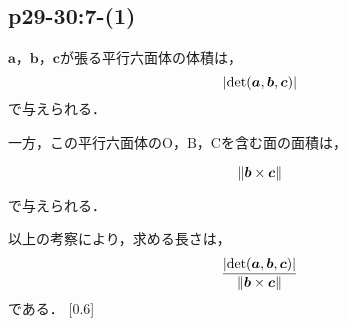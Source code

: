\documentclass[uplatex,dvipdfmx,a4paper,11pt,fleqn]{jsarticle}
\begin{document}
\subsection*{p29-30:7-(1)}

\begin{tleftbar}
$\bm{a}$，$\bm{b}$，$\bm{c}$が張る平行六面体の体積は，
\[
    \abs{\det (\bm{a},\bm{b},\bm{c})}
\]
で与えられる．

一方，この平行六面体の$\mathrm{O}$，$\mathrm{B}$，$\mathrm{C}$を含む面の面積は，

\[
    \norm{\bm{b} \times \bm{c}}
\]

で与えられる．

以上の考察により，求める長さは，
\[
    \frac{\abs{\det(\bm{a},\bm{b},\bm{c})}}{\norm{\bm{b} \times \bm{c}}}
\]
である．
\scalebox{0.6}[0.6]{
\begin{tikzpicture}[x=0.75pt,y=0.75pt,yscale=-1,xscale=1]
    

\end{tikzpicture}}
\end{tleftbar}
\end{document}
